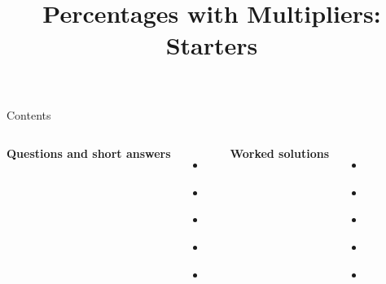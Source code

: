 \documentclass{beamer}
\title{Percentages with Multipliers: Starters}
\author{}
\date{}
\newcommand{\tightlist}{%
  \setlength{\itemsep}{0pt}\setlength{\parskip}{0pt}\setlength{\topsep}{0pt}%
}
\begin{document}
\frame{\titlepage}

\begin{frame}{Contents}
\small
\begin{columns}[T]
\textbf{Questions and short answers}
\begin{itemize}\tightlist
  \item \hyperlink{q-st1}{}
  \item \hyperlink{q-st2}{}
  \item \hyperlink{q-st3}{}
  \item \hyperlink{q-st4}{}
  \item \hyperlink{q-st5}{}
\end{itemize}

\textbf{Worked solutions}
\begin{itemize}\tightlist
  \item \hyperlink{work-st1}{}
  \item \hyperlink{work-st2}{}
  \item \hyperlink{work-st3}{}
  \item \hyperlink{work-st4}{}
  \item \hyperlink{work-st5}{}
\end{itemize}
\end{columns}
\end{frame}
\end{document}
